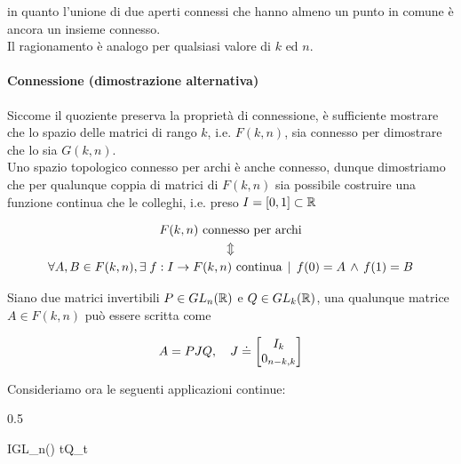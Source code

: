 {in quanto l'unione di due aperti connessi che hanno almeno un punto in comune è ancora un insieme connesso. \\
Il ragionamento è analogo per qualsiasi valore di $ k $ ed $ n $.

\paragraph{Connessione (dimostrazione alternativa)}


Siccome il quoziente preserva la proprietà di connessione, è sufficiente mostrare che lo spazio delle matrici di rango $ k $, i.e. $ F(k,n) $, sia connesso per dimostrare che lo sia $ G(k,n) $. \\
Uno spazio topologico connesso per archi è anche connesso, dunque dimostriamo che per qualunque coppia di matrici di $ F(k,n) $ sia possibile costruire una funzione continua che le colleghi, i.e. preso $ I = [0,1] \subset \mathbb{R} $

\begin{gather}
	F(k,n) \text{ connesso per archi} \nonumber \\
	\Updownarrow \\
	\forall A, B \in F(k,n), \E f : I \to F(k,n) \text{ continua} %
	\, \mid \, f(0) = A \, \wedge \, f(1) = B \nonumber
\end{gather}

Siano due matrici invertibili $ P \in GL_{n}(\mathbb{R}) $ e $ Q \in GL_{k}(\mathbb{R}) $, una qualunque matrice $ A \in F(k,n) $ può essere scritta come

\begin{equation}
	A = P J Q \qcomma J \doteq \bmqty{I_{k} \\ 0_{n-k,k}}
\end{equation}

Consideriamo ora le seguenti applicazioni continue:

	{0.5}{%
				{I}{GL_{n}(\R)}
				{t}{Q_{t}}
			
}}
